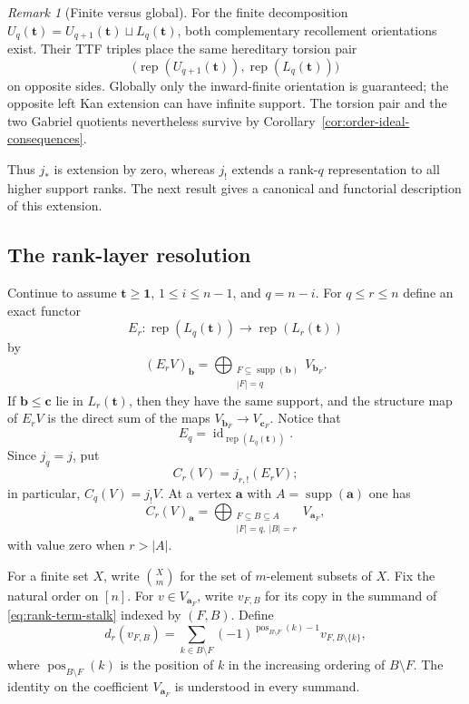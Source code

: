 \documentclass[12pt,reqno]{amsart}
\theoremstyle{definition}
\theoremstyle{remark}
\newtheorem{remark}[theorem]{Remark}
\newcommand{\Rep}{\operatorname{rep}}
\begin{document}
\begin{remark}[Finite versus global]\label{rem:finite-global-comparison}
For the finite decomposition
$U_q(\mathbf t)=U_{q+1}(\mathbf t)\sqcup L_q(\mathbf t)$, both complementary
recollement orientations exist.  Their TTF triples place the same hereditary
torsion pair
\[
\bigl(\Rep(U_{q+1}(\mathbf t)),\Rep(L_q(\mathbf t))\bigr)
\]
on opposite sides.  Globally only the inward-finite orientation is guaranteed;
the opposite left Kan extension can have infinite support.  The torsion pair
and the two Gabriel quotients nevertheless survive by
Corollary~\ref{cor:order-ideal-consequences}.
\end{remark}

Thus $j_*$ is extension by zero, whereas $j_!$ extends a rank-$q$ representation to all higher support ranks.  The next result gives a canonical and functorial description of this extension.

\subsection{The rank-layer resolution}\label{subsec:rank-resolution}

Continue to assume $\mathbf t\ge\mathbf1$, $1\le i\le n-1$, and $q=n-i$.
For $q\le r\le n$ define an exact functor
\[
E_r:\Rep(L_q(\mathbf t))\longrightarrow\Rep(L_r(\mathbf t))
\]
by
\[
(E_rV)_{\mathbf b}
=
\bigoplus_{\substack{F\subseteq\operatorname{supp}(\mathbf b)\\|F|=q}}
V_{\mathbf b_F}.
\]
If $\mathbf b\le\mathbf c$ lie in $L_r(\mathbf t)$, then they have the same support, and the structure map of $E_rV$ is the direct sum of the maps
$V_{\mathbf b_F}\to V_{\mathbf c_F}$.  Notice that
\[
E_q=\operatorname{id}_{\Rep(L_q(\mathbf t))}.
\]
Since $j_q=j$, put
\[
C_r(V)=j_{r,!}(E_rV);
\]
in particular, $C_q(V)=j_!V$.
At a vertex $\mathbf a$ with $A=\operatorname{supp}(\mathbf a)$ one has
\begin{equation}\label{eq:rank-term-stalk}
C_r(V)_{\mathbf a}
=
\bigoplus_{\substack{F\subseteq B\subseteq A\\|F|=q,\ |B|=r}}
V_{\mathbf a_F},
\end{equation}
with value zero when $r>|A|$.

For a finite set $X$, write $\binom{X}{m}$ for the set of $m$-element
subsets of $X$.
Fix the natural order on $[n]$.  For $v\in V_{\mathbf a_F}$, write
$v_{F,B}$ for its copy in the summand of \eqref{eq:rank-term-stalk} indexed by
$(F,B)$.  Define
\begin{equation}\label{eq:rank-differential}
d_r(v_{F,B})
=
\sum_{k\in B\setminus F}
(-1)^{\operatorname{pos}_{B\setminus F}(k)-1}
v_{F,B\setminus\{k\}},
\end{equation}
where $\operatorname{pos}_{B\setminus F}(k)$ is the position of $k$ in the increasing ordering of $B\setminus F$.  The identity on the coefficient $V_{\mathbf a_F}$ is understood in every summand.
\end{document}
